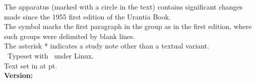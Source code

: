 \begin{center}
{The apparatus (marked with a circle in the text) contains significant changes made since the 1955 first edition of the Urantia Book.\\
The symbol \pc{} marks the first paragraph in the group as in the first edition, where such groups were delimited by blank lines.\\
The asterisk * indicates a study note other than a textual variant.\\[5pt]
\tux\ Typeset with \XeLaTeX\ under Linux.\\
Text set in \textbf{\urantiamainfont} at \urantiamainfontsize pt.\\[18pt]
\upshape\small\bfseries Version: \mytoday{}\\
}
\end{center}

\titleframe
